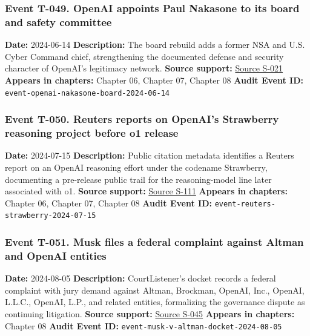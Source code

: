 \documentclass[
  american,
  11pt,
  letterpaper,
]{article}
\begin{document}
\subsubsection{Event T-049. OpenAI appoints Paul Nakasone to its board
and safety
committee}\label{event-t-049-openai-appoints-paul-nakasone-to-its-board-and-safety-committee}

\textbf{Date:} 2024-06-14 \textbf{Description:} The board rebuild adds a
former NSA and U.S. Cyber Command chief, strengthening the documented
defense and security character of OpenAI's legitimacy network.
\textbf{Source support:}
\hyperref[source-s-021-openai-appoints-former-top-us-cyberwarrior-paul-nakasone-to-its-board-of-directors]{Source
S-021} \textbf{Appears in chapters:} Chapter 06, Chapter 07, Chapter 08
\textbf{Audit Event ID:} \texttt{event-openai-nakasone-board-2024-06-14}

\subsubsection{Event T-050. Reuters reports on OpenAI's Strawberry
reasoning project before o1
release}\label{event-t-050-reuters-reports-on-openai-s-strawberry-reasoning-project-before-o1-release}

\textbf{Date:} 2024-07-15 \textbf{Description:} Public citation metadata
identifies a Reuters report on an OpenAI reasoning effort under the
codename Strawberry, documenting a pre-release public trail for the
reasoning-model line later associated with o1. \textbf{Source support:}
\hyperref[source-s-111-exclusive-openai-working-on-new-reasoning-technology-under-code-name-strawberry]{Source
S-111} \textbf{Appears in chapters:} Chapter 06, Chapter 07, Chapter 08
\textbf{Audit Event ID:} \texttt{event-reuters-strawberry-2024-07-15}

\subsubsection{Event T-051. Musk files a federal complaint against
Altman and OpenAI
entities}\label{event-t-051-musk-files-a-federal-complaint-against-altman-and-openai-entities}

\textbf{Date:} 2024-08-05 \textbf{Description:} CourtListener's docket
records a federal complaint with jury demand against Altman, Brockman,
OpenAI, Inc., OpenAI, L.L.C., OpenAI, L.P., and related entities,
formalizing the governance dispute as continuing litigation.
\textbf{Source support:}
\hyperref[source-s-045-musk-v-altman-4-24-cv-04722]{Source S-045}
\textbf{Appears in chapters:} Chapter 08 \textbf{Audit Event ID:}
\texttt{event-musk-v-altman-docket-2024-08-05}
\end{document}
